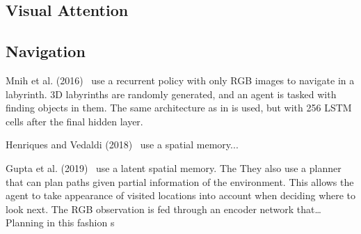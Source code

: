 


\subsection{Visual Attention}


\subsection{Navigation}


Mnih et al. (2016)~\cite{mnih_asynchronous_2016} use a recurrent policy with only RGB images to navigate in a labyrinth.
3D labyrinths are randomly generated, and an agent is tasked with finding objects in them.
The same architecture as in \cite{mnih_human_2015} is used, but with 256 LSTM cells after the final hidden layer.






Henriques and Vedaldi (2018)~\cite{henriques_vedaldi_2018} use a spatial memory...

Gupta et al. (2019)~\cite{gupta_cognitive_2019} use a latent spatial memory.
The 
They also use a planner that can plan paths given partial information of the environment.
This allows the agent to take appearance of visited locations into account when deciding where to look next.
The RGB observation is fed through an encoder network that\dots
Planning in this fashion s

